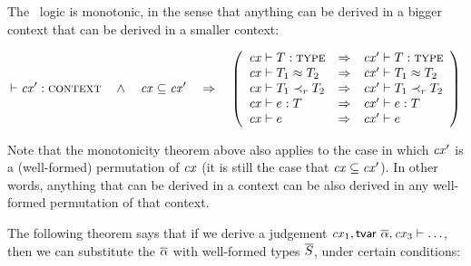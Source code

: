 The \MS\ logic is monotonic, in the sense that anything can be derived in a
bigger context that can be derived in a smaller context:

\begin{theorem}\label{thm-mono}
\[
\cxwf{\cx'}\ \ \AND\ \ \cx\subseteq\cx'\ \ \IMPLIES\ \
\left(
\begin{array}{l@{\ \ \IMPLIES\ \ }l}
\istyO{\typ}                     & \isty{\cx'}{\typ}                     \\
\teqO{\typ_1}{\typ_2}            & \teq{\cx'}{\typ_1}{\typ_2}            \\
\issubO{\typ_1}{\tspred}{\typ_2} & \issub{\cx'}{\typ_1}{\tspred}{\typ_2} \\
\hastyO{\expr}{\typ}             & \hasty{\cx'}{\expr}{\typ}             \\
\theoO{\expr}                    & \theo{\cx'}{\expr}
\end{array}
\right)
\]
\end{theorem}

Note that the monotonicity theorem above also applies to the case in which
$\mathit{cx}'$ is a (well-formed) permutation of $\mathit{cx}$ (it is still the case that
$\mathit{cx}\subseteq\mathit{cx}'$). In other words, anything that can be derived in a context
can be also derived in any well-formed permutation of that context.

The following theorem says that if we derive a judgement
$\mathit{cx}_1,\mathsf{tvar}\ \overline{\alpha},\mathit{cx}_3\vdash\ldots$, then we can substitute the $\overline{\alpha}$
with well-formed types $\overline{S}$, under certain conditions:

